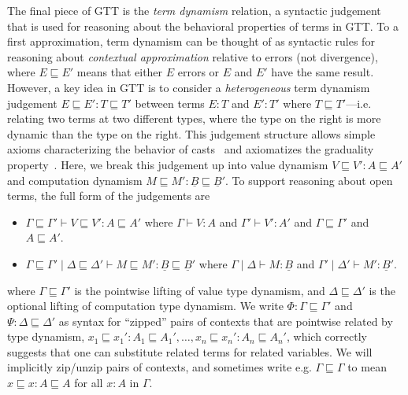 \documentclass[acmsmall,screen,12pt]{acmart}
\renewcommand{\u}{\underline}
\newcommand{\ltdyn}{\sqsubseteq}
\begin{document}
The final piece of GTT is the \emph{term dynamism} relation, a syntactic
judgement that is used for reasoning about the behavioral properties of
terms in GTT.  To a first approximation, term dynamism can be thought of
as syntactic rules for reasoning about \emph{contextual approximation}
relative to errors (not divergence), where $E \ltdyn E'$ means that
either $E$ errors or $E$ and $E'$ have the same result.  However, a key
idea in GTT is to consider a \emph{heterogeneous} term dynamism
judgement $E \ltdyn E' : T \ltdyn T'$ between terms $E : T$ and $E' :
T'$ where $T \ltdyn T'$---i.e. relating two terms at two different
types, where the type on the right is more dynamic than the type on the
right.  This judgement structure allows simple axioms characterizing the
%
behavior of casts~\cite{newlicata2018-fscd} and axiomatizes the
graduality property~\cite{refined}.
%
Here, we break this judgement up into
%
value dynamism $V \ltdyn V' : A \ltdyn A'$ and computation dynamism $M
\ltdyn M' : \u B \ltdyn \u B'$.  To support reasoning about open terms,
the full form of the judgements are
\begin{itemize}
\item $\Gamma \ltdyn \Gamma' \vdash V \ltdyn V' : A \ltdyn A'$ where
  $\Gamma \vdash V : A$ and $\Gamma' \vdash V' : A'$ and $\Gamma \ltdyn
  \Gamma'$ and $A \ltdyn A'$.
\item 
$\Gamma \ltdyn \Gamma' \mid \Delta \ltdyn \Delta' \vdash M \ltdyn M' :
  \u B \ltdyn \u B'$ where $\Gamma \mid \Delta \vdash M : \u B$ and
  $\Gamma' \mid \Delta' \vdash M' : \u B'$.
\end{itemize}
where $\Gamma \ltdyn \Gamma'$ is the pointwise lifting of value type
dynamism, and $\Delta \ltdyn \Delta'$ is the optional lifting of
computation type dynamism.  We write $\Phi : \Gamma \ltdyn \Gamma'$ and
$\Psi : \Delta \ltdyn \Delta'$ as syntax for ``zipped'' pairs of
contexts that are pointwise related by type dynamism, $x_1 \ltdyn x_1' : A_1 \ltdyn A_1', \ldots, x_n \ltdyn x_n' :
A_n \ltdyn A_n'$, which correctly suggests that one can substitute related
terms for related variables.  We will implicitly zip/unzip pairs of
contexts, and sometimes write e.g. $\Gamma \ltdyn \Gamma$ to mean $x
\ltdyn x : A \ltdyn A$ for all $x : A$ in $\Gamma$.
\end{document}
